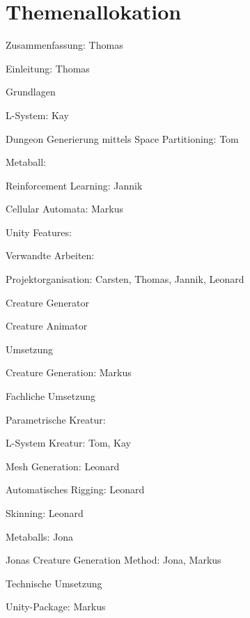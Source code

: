 \chapter*{Themenallokation} 

\begin{thallok}
	\item[] Zusammenfassung: Thomas
	\item Einleitung: Thomas
	\item Grundlagen
	\begin{thallok}
		\item L-System: Kay
		\item Dungeon Generierung mittels Space Partitioning: Tom
		\item Metaball:
		\item Reinforcement Learning: Jannik
		\item Cellular Automata: Markus
		\item Unity Features:
	\end{thallok}
	\item Verwandte Arbeiten:
	\item Projektorganisation: Carsten, Thomas, Jannik, Leonard
	\begin{thallok}
		\item Creature Generator
		\item Creature Animator
	\end{thallok}
	\item Umsetzung
	\begin{thallok}
		\item Creature Generation: Markus
		\begin{thallok}
			\item Fachliche Umsetzung
			\begin{thallok}
				\item Parametrische Kreatur:
				\item L-System Kreatur: Tom, Kay
				\item Mesh Generation: Leonard
				\item Automatisches Rigging: Leonard
				\item Skinning: Leonard
				\item Metaballs: Jona
				\item Jonas Creature Generation Method: Jona, Markus
			\end{thallok}
			\item Technische Umsetzung
			\begin{thallok}
				\item Unity-Package: Markus

\end{thallok}
\end{thallok}
\end{thallok}
\end{thallok}

